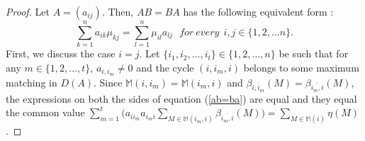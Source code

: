 \documentclass[10pt,a4paper]{amsart}
\begin{document}
\begin{proof}
Let $A=(a_{ij})$. Then, $AB=BA$ has the following equivalent form :
\begin{equation}\label{ab=ba}
\sum _{k=1}^na_{ik}\mu _{kj}=\sum _{l=1}^n\mu _{il} a_{lj}\  \  \  for~every\  \  i,j\in \{1,2,\ldots n\}.
\end{equation}
First, we discuss the case $i=j$. Let $\{i_1,i_2,\ldots ,i_t\}\in \{1,2,\ldots ,n\}$ be such that for any $m\in \{1,2,\ldots ,t\}$, $a_{i,i_m}\neq 0$ and the cycle $(i,i_m,i)$ belongs to some maximum matching in $D(A)$. Since $\mathbb{M}(i,i_m)=\mathbb{M}(i_m,i)$ and $\beta _{\overline{i,i_m}}(M)=\beta _{\overline{i_m,i}}(M)$, the expressions on both the sides of equation (\ref{ab=ba}) are equal and they equal the common value $\sum_{m=1}^t\big (a_{ii_m}a_{i_mi}\sum _{M\in \mathbb{M}(i_m,i)}\beta _{\overline{i_m,i}}(M)\big)=\sum _{M\in \mathbb{M}(i)}\eta (M)$.


\end{proof}
\end{document}
